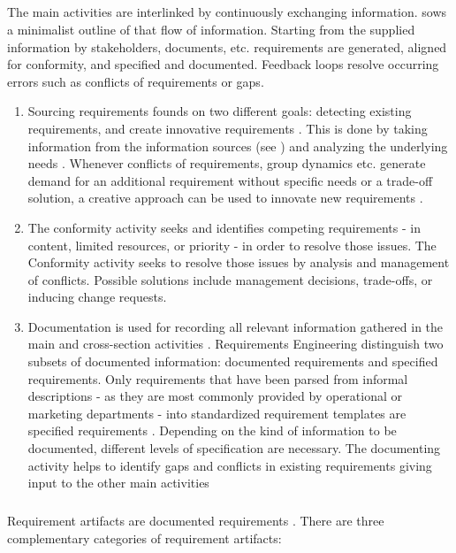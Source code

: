 \subparagraph{} The main activities are interlinked by continuously exchanging information.  sows a minimalist outline of that flow of information. Starting from the supplied information by stakeholders, documents, etc. requirements are generated, aligned for conformity, and specified and documented. Feedback loops resolve occurring errors such as conflicts of requirements or gaps.
\begin{enumerate}
    \item Sourcing requirements founds on two different goals: detecting existing requirements, and create innovative requirements \parencite[cf.][318, 321]{Pohl.2007}. This is done by taking information from the information sources (see ) and analyzing the underlying needs \parencite[cf.][75-76]{Sommerville.2000}. Whenever conflicts of requirements, group dynamics etc. generate demand for an additional requirement without specific needs or a trade-off solution, a creative approach can be used to innovate new requirements \parencite[cf.][94]{Lauesen.2008}. 
    \item The conformity activity seeks and identifies competing requirements - in content, limited resources, or priority - in order to resolve those issues. The Conformity activity seeks to resolve those issues by analysis and management of conflicts. Possible solutions include management decisions, trade-offs, or inducing change requests. \parencite[cf.][393]{Pohl.2007}
    \item{Documentation} is used for recording all relevant information gathered in the main and cross-section activities \parencite[cf.][217]{Pohl.2007}. Requirements Engineering distinguish two subsets of documented information: documented requirements and specified requirements. Only requirements that have been parsed from informal descriptions - as they are most commonly provided by operational or marketing departments - into standardized requirement templates are specified requirements \parencite[cf.][101]{Ebert.2014}. Depending on the kind of information to be documented, different levels of specification are necessary. The documenting activity helps to identify gaps and conflicts in existing requirements giving input to the other main activities \parencite[212]{Pohl.2007}
\end{enumerate}

\subparagraph{} Requirement artifacts are documented requirements \parencite[85]{Pohl.2007}. There are three complementary categories of requirement artifacts: 

